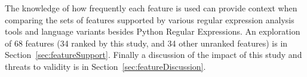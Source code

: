 The knowledge of how frequently each feature is used can provide context when comparing the sets of features supported by various regular expression analysis tools and language variants besides Python Regular Expressions.  An exploration of 68 features (34 ranked by this study, and 34 other unranked features) is in Section~\ref{sec:featureSupport}.  Finally a discussion of the impact of this study and threats to validity is in Section~\ref{sec:featureDiscussion}.
